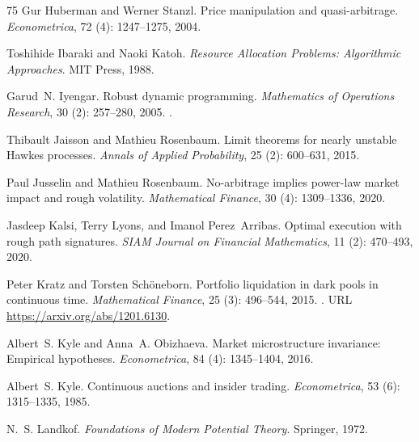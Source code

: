 \documentclass[11pt]{article}
\numberwithin{equation}{section}
\theoremstyle{definition}
\theoremstyle{remark}
\theoremstyle{definition}
\begin{document}
\begin{thebibliography}{75}
Gur Huberman and Werner Stanzl.
\newblock Price manipulation and quasi-arbitrage.
\newblock \emph{Econometrica}, 72 (4): 1247--1275, 2004.

Toshihide Ibaraki and Naoki Katoh.
\newblock \emph{Resource Allocation Problems: Algorithmic Approaches}.
\newblock MIT Press, 1988.

Garud~N. Iyengar.
\newblock Robust dynamic programming.
\newblock \emph{Mathematics of Operations Research}, 30 (2):
  257--280, 2005.
\newblock {}.

Thibault Jaisson and Mathieu Rosenbaum.
\newblock Limit theorems for nearly unstable {H}awkes processes.
\newblock \emph{Annals of Applied Probability}, 25 (2):
  600--631, 2015.

Paul Jusselin and Mathieu Rosenbaum.
\newblock No-arbitrage implies power-law market impact and rough volatility.
\newblock \emph{Mathematical Finance}, 30 (4): 1309--1336,
  2020.

Jasdeep Kalsi, Terry Lyons, and Imanol Perez~Arribas.
\newblock Optimal execution with rough path signatures.
\newblock \emph{SIAM Journal on Financial Mathematics}, 11
  (2): 470--493, 2020.

Peter Kratz and Torsten Sch{\"o}neborn.
\newblock Portfolio liquidation in dark pools in continuous time.
\newblock \emph{Mathematical Finance}, 25 (3): 496--544,
  2015.
\newblock {}.
\newblock URL \url{https://arxiv.org/abs/1201.6130}.

Albert~S. Kyle and Anna~A. Obizhaeva.
\newblock Market microstructure invariance: Empirical hypotheses.
\newblock \emph{Econometrica}, 84 (4): 1345--1404, 2016.

Albert~S. Kyle.
\newblock Continuous auctions and insider trading.
\newblock \emph{Econometrica}, 53 (6): 1315--1335, 1985.

N.~S. Landkof.
\newblock \emph{Foundations of Modern Potential Theory}.
\newblock Springer, 1972.


\end{thebibliography}
\end{document}

